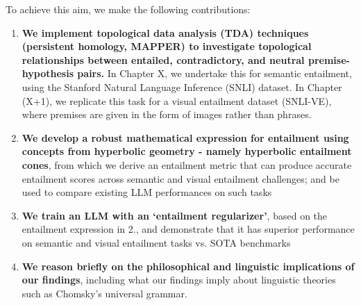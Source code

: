 \documentclass[12pt,twoside]{report}
\begin{document}
To achieve this aim, we make the following contributions: 

\begin{enumerate}[itemsep=0pt]
    \item \textbf{We implement topological data analysis (TDA) techniques (persistent homology, MAPPER) to investigate topological relationships between entailed, contradictory, and neutral premise-hypothesis pairs.} In Chapter X, we undertake this for semantic entailment, using the Stanford Natural Language Inference (SNLI) dataset. In Chapter (X+1), we replicate this task for a visual entailment dataset (SNLI-VE), where premises are given in the form of images rather than phrases.
    \item \textbf{We develop a robust mathematical expression for entailment using concepts from hyperbolic geometry - namely hyperbolic entailment cones}, from which we derive an entailment metric that can produce accurate entailment scores across semantic and visual entailment challenges; and be used to compare existing LLM performances on such tasks
    \item \textbf{We train an LLM with an `entailment regularizer'}, based on the entailment expression in 2., and demonstrate that it has superior performance on semantic and visual entailment tasks vs. SOTA benchmarks 
    \item \textbf{We reason briefly on the philosophical and linguistic implications of our findings}, including what our findings imply about linguistic theories such as Chomsky's universal grammar. 
\end{enumerate}
\end{document}
